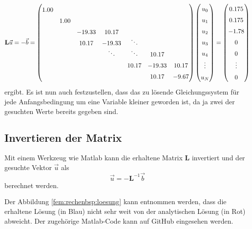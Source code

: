 \begin{equation}
    \def\arraystretch{1.5}
    \mathbf{L}\vec{u} 
    = -\vec{b} 
    = \begin{pmatrix}
         1.00  &        &        &                &                &        &        \\
               &  1.00  &        &                &                &        &        \\
               &        &-19.33  & 10.17          &                &        &        \\
               &        & 10.17  &-19.33          & \smash{\ddots} &        &        \\
               &        &        & \smash{\ddots} & \smash{\ddots} & 10.17  &        \\
               &        &        &                & 10.17          &-19.33  & 10.17  \\
               &        &        &                &                & 10.17  & -9.67  
    \end{pmatrix}
    \begin{pmatrix}
        u_0 \\ u_1 \\ u_2 \\ u_3 \\ u_4 \\ \vdots \\ u_N
    \end{pmatrix}
    =
    \begin{pmatrix}
        0.175 \\ 0.175 \\ -1.78 \\ 0 \\ 0 \\ \vdots \\ 0
    \end{pmatrix}
\end{equation}
ergibt.
Es ist nun auch festzustellen, dass das zu lösende Gleichungssystem für jede Anfangsbedingung um eine Variable kleiner geworden ist, da ja zwei der gesuchten Werte bereits gegeben sind.


\subsection{Invertieren der Matrix}
Mit einem Werkzeug wie Matlab kann die erhaltene Matrix $\mathbf{L}$ invertiert und der gesuchte Vektor $\vec{u}$ als 
\begin{equation}
    \vec{u} = - \mathbf{L}^{-1} \vec{b}
\end{equation}
berechnet werden.

Der Abbildung \ref{fem:rechenbsp:loesung} kann entnommen werden, dass die erhaltene Lösung (in Blau) nicht sehr weit von der analytischen Lösung (in Rot) abweicht.
Der zugehörige Matlab-Code kann auf GitHub \cite{fem:bib:matlab} eingesehen werden.